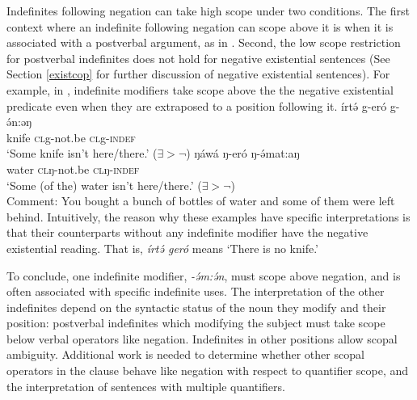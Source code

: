 Indefinites following negation can take high scope under two conditions. The first context where an indefinite following negation can scope above it is when it is associated with a postverbal argument, as in . Second, the low scope restriction for postverbal indefinites does not hold for negative existential sentences (See Section \ref{existcop} for further discussion of negative existential sentences). For example, in , indefinite modifiers take scope above the the negative existential predicate even when they are extraposed to a position following it.
\ea  \label{ex:ch8:negexindef}
	\gll	írtə́	  g-eró g-ə́n:əŋ\\
				knife 	\textsc{cl}g-not.be \textsc{cl}g-\textsc{indef}\\
		\glt 	‘Some knife isn't here/there.’  ($\exists>\neg$)
\ex	\gll	ŋáwá	ŋ-eró ŋ-ə́mat:aŋ\\
				water 	\textsc{cl}ŋ-not.be \textsc{cl}ŋ-\textsc{indef}\\
		\glt 	‘Some (of the) water isn't here/there.’ ($\exists>\neg$)\\
				Comment: You bought a bunch of bottles of water and some of them were left behind.  %
	\z 
Intuitively, the reason why these examples have specific interpretations is that their counterparts without any indefinite modifier have the negative existential reading. That is, \textit{írtə́ geró} means `There is no knife.' 


To conclude, one indefinite modifier, \textit{-ə́m:ə́n}, must scope above negation, and is often associated with specific indefinite uses. The interpretation of the other indefinites depend on the syntactic status of the noun they modify and their position: postverbal indefinites which modifying the subject must take scope below verbal operators like negation. Indefinites in other positions allow scopal ambiguity. Additional work is needed to determine whether other scopal operators in the clause behave like negation with respect to quantifier scope, and the interpretation of sentences with multiple quantifiers.









%
%



